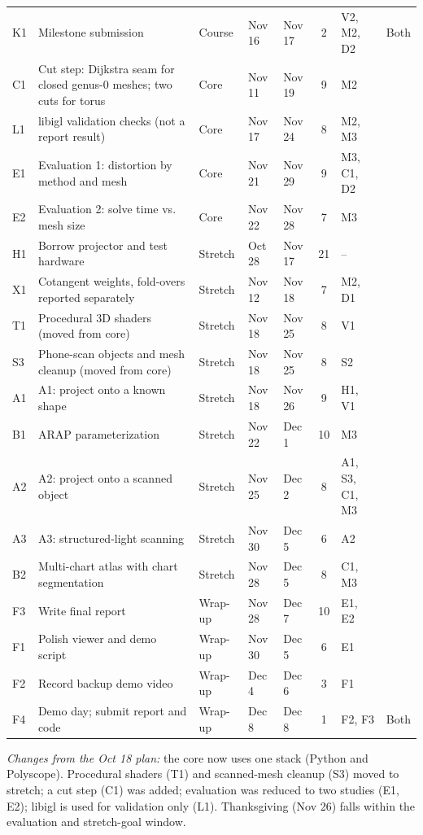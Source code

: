 \documentclass[11pt]{article}
\newcommand{\trcourse}{\rowcolor{course}}
\newcommand{\trcore}{\rowcolor{core}}
\newcommand{\trstretch}{\rowcolor{stretch}}
\newcommand{\trfinal}{\rowcolor{final}}
\begin{document}
\begin{longtable}{@{}l >{\raggedright\arraybackslash}p{7.5cm} l l l c >{\raggedright\arraybackslash}p{3cm} p{2.5cm}@{}}
\trcourse K1 & Milestone submission & Course & Nov 16 & Nov 17 & 2 & V2, M2, D2 & Both \\
\trcore C1 & Cut step: Dijkstra seam for closed genus-0 meshes; two cuts for torus & Core & Nov 11 & Nov 19 & 9 & M2 &  \\
\trcore L1 & libigl validation checks (not a report result) & Core & Nov 17 & Nov 24 & 8 & M2, M3 &  \\
\trcore E1 & Evaluation 1: distortion by method and mesh & Core & Nov 21 & Nov 29 & 9 & M3, C1, D2 &  \\
\trcore E2 & Evaluation 2: solve time vs. mesh size & Core & Nov 22 & Nov 28 & 7 & M3 &  \\
\trstretch H1 & Borrow projector and test hardware & Stretch & Oct 28 & Nov 17 & 21 & -- &  \\
\trstretch X1 & Cotangent weights, fold-overs reported separately & Stretch & Nov 12 & Nov 18 & 7 & M2, D1 &  \\
\trstretch T1 & Procedural 3D shaders (moved from core) & Stretch & Nov 18 & Nov 25 & 8 & V1 &  \\
\trstretch S3 & Phone-scan objects and mesh cleanup (moved from core) & Stretch & Nov 18 & Nov 25 & 8 & S2 &  \\
\trstretch A1 & A1: project onto a known shape & Stretch & Nov 18 & Nov 26 & 9 & H1, V1 &  \\
\trstretch B1 & ARAP parameterization & Stretch & Nov 22 & Dec 1 & 10 & M3 &  \\
\trstretch A2 & A2: project onto a scanned object & Stretch & Nov 25 & Dec 2 & 8 & A1, S3, C1, M3 &  \\
\trstretch A3 & A3: structured-light scanning & Stretch & Nov 30 & Dec 5 & 6 & A2 &  \\
\trstretch B2 & Multi-chart atlas with chart segmentation & Stretch & Nov 28 & Dec 5 & 8 & C1, M3 &  \\
\trfinal F3 & Write final report & Wrap-up & Nov 28 & Dec 7 & 10 & E1, E2 &  \\
\trfinal F1 & Polish viewer and demo script & Wrap-up & Nov 30 & Dec 5 & 6 & E1 &  \\
\trfinal F2 & Record backup demo video & Wrap-up & Dec 4 & Dec 6 & 3 & F1 &  \\
\trfinal F4 & Demo day; submit report and code & Wrap-up & Dec 8 & Dec 8 & 1 & F2, F3 & Both \\
\end{longtable}

\noindent\textit{Changes from the Oct 18 plan:} the core now uses one stack (Python and Polyscope). Procedural shaders (T1) and scanned-mesh cleanup (S3) moved to stretch; a cut step (C1) was added; evaluation was reduced to two studies (E1, E2); libigl is used for validation only (L1). Thanksgiving (Nov 26) falls within the evaluation and stretch-goal window.
\end{document}

